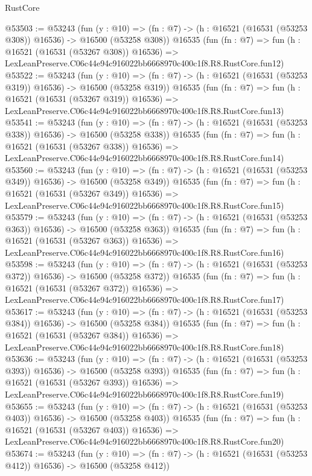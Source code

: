 \begin{lexlean}{RustCore}
\begin{coremodule}
@53503 := @53243
    (fun (y : @10) =>
    (fn : @7) -> (h : @16521 (@16531 (@53253 @308)) @16536) -> @16500 (@53258 @308))
    @16535
    (fun (fn : @7) =>
    fun (h : @16521 (@16531 (@53267 @308)) @16536) =>
    LexLeanPreserve.C06c44e94c916022bb6668970c400c1f8.R8.RustCore.fun12)
@53522 := @53243
    (fun (y : @10) =>
    (fn : @7) -> (h : @16521 (@16531 (@53253 @319)) @16536) -> @16500 (@53258 @319))
    @16535
    (fun (fn : @7) =>
    fun (h : @16521 (@16531 (@53267 @319)) @16536) =>
    LexLeanPreserve.C06c44e94c916022bb6668970c400c1f8.R8.RustCore.fun13)
@53541 := @53243
    (fun (y : @10) =>
    (fn : @7) -> (h : @16521 (@16531 (@53253 @338)) @16536) -> @16500 (@53258 @338))
    @16535
    (fun (fn : @7) =>
    fun (h : @16521 (@16531 (@53267 @338)) @16536) =>
    LexLeanPreserve.C06c44e94c916022bb6668970c400c1f8.R8.RustCore.fun14)
@53560 := @53243
    (fun (y : @10) =>
    (fn : @7) -> (h : @16521 (@16531 (@53253 @349)) @16536) -> @16500 (@53258 @349))
    @16535
    (fun (fn : @7) =>
    fun (h : @16521 (@16531 (@53267 @349)) @16536) =>
    LexLeanPreserve.C06c44e94c916022bb6668970c400c1f8.R8.RustCore.fun15)
@53579 := @53243
    (fun (y : @10) =>
    (fn : @7) -> (h : @16521 (@16531 (@53253 @363)) @16536) -> @16500 (@53258 @363))
    @16535
    (fun (fn : @7) =>
    fun (h : @16521 (@16531 (@53267 @363)) @16536) =>
    LexLeanPreserve.C06c44e94c916022bb6668970c400c1f8.R8.RustCore.fun16)
@53598 := @53243
    (fun (y : @10) =>
    (fn : @7) -> (h : @16521 (@16531 (@53253 @372)) @16536) -> @16500 (@53258 @372))
    @16535
    (fun (fn : @7) =>
    fun (h : @16521 (@16531 (@53267 @372)) @16536) =>
    LexLeanPreserve.C06c44e94c916022bb6668970c400c1f8.R8.RustCore.fun17)
@53617 := @53243
    (fun (y : @10) =>
    (fn : @7) -> (h : @16521 (@16531 (@53253 @384)) @16536) -> @16500 (@53258 @384))
    @16535
    (fun (fn : @7) =>
    fun (h : @16521 (@16531 (@53267 @384)) @16536) =>
    LexLeanPreserve.C06c44e94c916022bb6668970c400c1f8.R8.RustCore.fun18)
@53636 := @53243
    (fun (y : @10) =>
    (fn : @7) -> (h : @16521 (@16531 (@53253 @393)) @16536) -> @16500 (@53258 @393))
    @16535
    (fun (fn : @7) =>
    fun (h : @16521 (@16531 (@53267 @393)) @16536) =>
    LexLeanPreserve.C06c44e94c916022bb6668970c400c1f8.R8.RustCore.fun19)
@53655 := @53243
    (fun (y : @10) =>
    (fn : @7) -> (h : @16521 (@16531 (@53253 @403)) @16536) -> @16500 (@53258 @403))
    @16535
    (fun (fn : @7) =>
    fun (h : @16521 (@16531 (@53267 @403)) @16536) =>
    LexLeanPreserve.C06c44e94c916022bb6668970c400c1f8.R8.RustCore.fun20)
@53674 := @53243
    (fun (y : @10) =>
    (fn : @7) -> (h : @16521 (@16531 (@53253 @412)) @16536) -> @16500 (@53258 @412))

\end{coremodule}
\end{lexlean}
